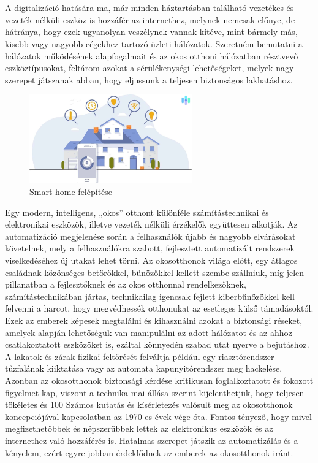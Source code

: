 \chapter{\bevezetes}

A digitalizáció hatására ma, már minden háztartásban található vezetékes és vezeték nélküli eszköz is hozzáfér az internethez, melynek nemcsak előnye, de hátránya, hogy ezek ugyanolyan veszélynek vannak kitéve, mint bármely más, kisebb vagy nagyobb cégekhez tartozó üzleti hálózatok. Szeretném bemutatni a hálózatok működésének alapfogalmait és az okos otthoni hálózatban résztvevő eszköztípusokat, feltárom azokat a sérülékenységi lehetőségeket, melyek nagy szerepet játszanak abban, hogy eljussunk a teljesen biztonságos lakhatáshoz.
\begin{figure}[!ht]
    \centering
    \includegraphics[width=70mm, keepaspectratio]{figures/What-is-a-Smart-Home.jpg}
    \caption{Smart home felépítése}
\end{figure}
\par Egy modern, intelligens, „okos” otthont különféle számítástechnikai és elektronikai eszközök, illetve vezeték nélküli érzékelők együttesen alkotják. Az automatizáció megjelenése során a felhasználók újabb és nagyobb elvárásokat követelnek, mely a felhasználókra szabott, fejlesztett automatizált rendszerek viselkedéséhez új utakat lehet törni. Az okosotthonok világa előtt, egy átlagos családnak közönséges betörőkkel, bűnözőkkel kellett szembe szállniuk, míg jelen pillanatban a fejlesztőknek és az okos otthonnal rendelkezőknek, számítástechnikában jártas, technikailag igencsak fejlett kiberbűnőzökkel kell felvenni a harcot, hogy megvédhessék otthonukat az esetleges külső támadásoktól. Ezek az emberek képesek megtalálni és kihasználni azokat a biztonsági réseket, amelyek alapján lehetőségük van manipulálni az adott hálózatot és az ahhoz csatlakoztatott eszközöket is, ezáltal könnyedén szabad utat nyerve a bejutáshoz. A lakatok és zárak fizikai feltörését felváltja például egy riasztórendszer tűzfalának kiiktatása vagy az automata kapunyitórendszer meg hackelése. Azonban az okosotthonok biztonsági kérdése kritikusan foglalkoztatott és fokozott figyelmet kap, viszont a technika mai állása szerint kijelenthetjük, hogy teljesen tökéletes és 100%
Számos kutatás és kísérletezés valósult meg az okosotthonok koncepciójával kapcsolatban az 1970-es évek vége óta. Fontos tényező, hogy mivel megfizethetőbbek és népszerűbbek lettek az elektronikus eszközök és az internethez való hozzáférés is. Hatalmas szerepet játszik az automatizálás és a kényelem, ezért egyre jobban érdeklődnek az emberek az okosotthonok iránt. 
\cite{smart-homes}